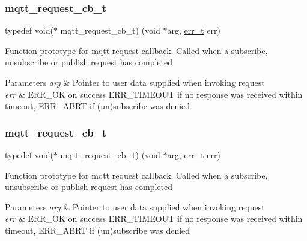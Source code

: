 \subsubsection{\texorpdfstring{mqtt\+\_\+request\+\_\+cb\+\_\+t}{mqtt\_request\_cb\_t}\hspace{0.1cm}{\footnotesize\ttfamily [1/2]}}
{\footnotesize\ttfamily typedef void($\ast$ mqtt\+\_\+request\+\_\+cb\+\_\+t) (void $\ast$arg, \hyperlink{group__infrastructure__errors_gaf02d9da80fd66b4f986d2c53d7231ddb}{err\+\_\+t} err)}

Function prototype for mqtt request callback. Called when a subscribe, unsubscribe or publish request has completed 
\begin{DoxyParams}{Parameters}
{\em arg} & Pointer to user data supplied when invoking request \\
\hline
{\em err} & E\+R\+R\+\_\+\+OK on success E\+R\+R\+\_\+\+T\+I\+M\+E\+O\+UT if no response was received within timeout, E\+R\+R\+\_\+\+A\+B\+RT if (un)subscribe was denied \\
\hline
\end{DoxyParams}
\mbox{\label{group__mqtt_gacad2bbe2cee76eaa120cc63e2f6094fd}} 
\subsubsection{\texorpdfstring{mqtt\+\_\+request\+\_\+cb\+\_\+t}{mqtt\_request\_cb\_t}\hspace{0.1cm}{\footnotesize\ttfamily [2/2]}}
{\footnotesize\ttfamily typedef void($\ast$ mqtt\+\_\+request\+\_\+cb\+\_\+t) (void $\ast$arg, \hyperlink{group__infrastructure__errors_gaf02d9da80fd66b4f986d2c53d7231ddb}{err\+\_\+t} err)}

Function prototype for mqtt request callback. Called when a subscribe, unsubscribe or publish request has completed 
\begin{DoxyParams}{Parameters}
{\em arg} & Pointer to user data supplied when invoking request \\
\hline
{\em err} & E\+R\+R\+\_\+\+OK on success E\+R\+R\+\_\+\+T\+I\+M\+E\+O\+UT if no response was received within timeout, E\+R\+R\+\_\+\+A\+B\+RT if (un)subscribe was denied \\
\hline
\end{DoxyParams}


